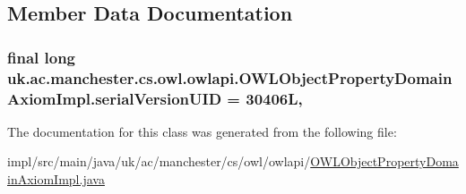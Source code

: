 \subsection{Member Data Documentation}
\hypertarget{classuk_1_1ac_1_1manchester_1_1cs_1_1owl_1_1owlapi_1_1_o_w_l_object_property_domain_axiom_impl_ab7df58292d70f97084697707b0ec1b4c}{
\subsubsection[{serial\-Version\-U\-I\-D}]{\setlength{\rightskip}{0pt plus 5cm}final long uk.\-ac.\-manchester.\-cs.\-owl.\-owlapi.\-O\-W\-L\-Object\-Property\-Domain\-Axiom\-Impl.\-serial\-Version\-U\-I\-D = 30406\-L\hspace{0.3cm}{\ttfamily [static]}, {\ttfamily [private]}}}\label{classuk_1_1ac_1_1manchester_1_1cs_1_1owl_1_1owlapi_1_1_o_w_l_object_property_domain_axiom_impl_ab7df58292d70f97084697707b0ec1b4c}


The documentation for this class was generated from the following file\-:\begin{DoxyCompactItemize}
\item 
impl/src/main/java/uk/ac/manchester/cs/owl/owlapi/\hyperlink{_o_w_l_object_property_domain_axiom_impl_8java}{O\-W\-L\-Object\-Property\-Domain\-Axiom\-Impl.\-java}\end{DoxyCompactItemize}

